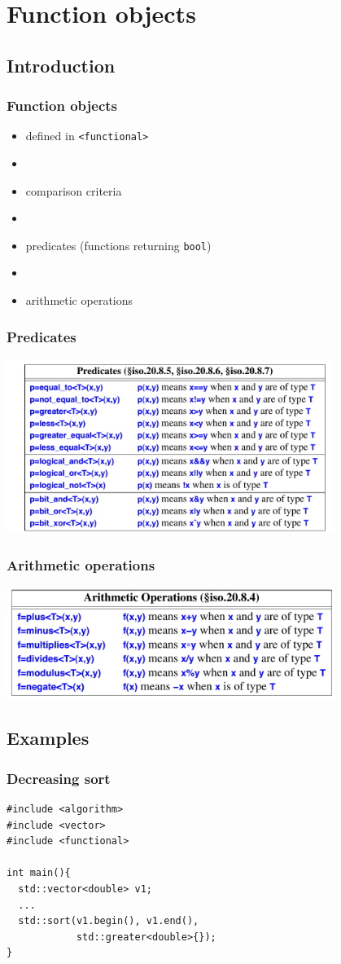 \section{Function objects}
\subsection{Introduction}
\begin{frame}
  \frametitle{Function objects}
  \begin{itemize}
  \item defined in \texttt{<functional>}
  \item[]
  \item comparison criteria
  \item[]
  \item predicates (functions returning \texttt{bool})
  \item[]
  \item arithmetic operations
  \end{itemize}
\end{frame}
\begin{frame}
  \frametitle{Predicates}
  \centering
  \includegraphics[width=0.8\textwidth]{img/predicates.png}
\end{frame}
\begin{frame}
  \frametitle{Arithmetic operations}
  \centering
  \includegraphics[width=0.8\textwidth]{img/arithmetic.png}
\end{frame}

\subsection{Examples}
\begin{frame}[fragile]
  \frametitle{Decreasing sort}
\begin{lstlisting}
#include <algorithm>
#include <vector>
#include <functional>
  
int main(){
  std::vector<double> v1;
  ...
  std::sort(v1.begin(), v1.end(),
            std::greater<double>{});
}
\end{lstlisting}
\end{frame}
